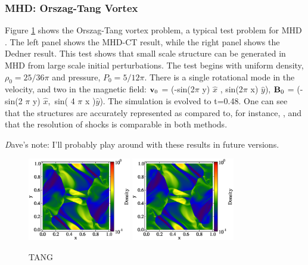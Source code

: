 \subsubsection{MHD: Orszag-Tang Vortex}
\label{sec.tests.mhd}
Figure \ref{fig.orszag} shows the Orszag-Tang vortex problem, a
typical test problem for MHD \citep{Orszag79}.  The left panel shows
the MHD-CT result, while the right panel shows the Dedner result.
This test shows that small scale structure can be generated in MHD
from large scale initial perturbations.  The test begins with uniform
density, $\rho_0=25/36 \pi$ and pressure, $P_0=5/12 \pi$.  There is a
single rotational mode in the velocity, and two in the magnetic field:
${\bf v}_0 $ = (-sin(2$\pi$ y) $ \hat{x}$ , sin(2$\pi$ x) $\hat{y}$),
${\bf B}_0$ = (-sin(2 $\pi$ y) $ \hat{x},$ sin( 4 $\pi$ x )$\hat{y}$).
The simulation is evolved to t=0.48.  One can see that the structures
are accurately represented as compared to, for instance,
\citet{Toth00}, and that the resolution of shocks is comparable in
both methods.

{\emph Dave's note: I'll probably play around with these results in
future versions.}

\begin{figure}
\begin{center}
\includegraphics[width=0.4\textwidth]{figures/MHDCT_OrszagTang_Density.eps}
\includegraphics[width=0.4\textwidth]{figures/MHDDedner_OrszagTang_Density.eps}
\caption{TANG}
\label{fig.orszag}
\end{center}
\end{figure}


